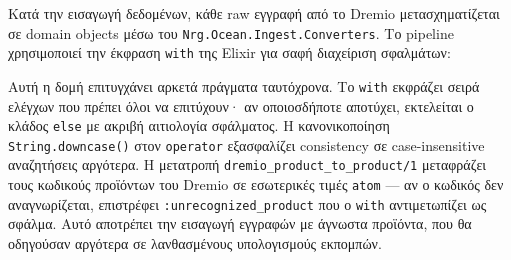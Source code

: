 Κατά την εισαγωγή δεδομένων, κάθε raw εγγραφή από το Dremio
μετασχηματίζεται σε domain objects μέσω του
\texttt{Nrg.Ocean.Ingest.Converters}. Το pipeline χρησιμοποιεί την
έκφραση \texttt{with} της Elixir για σαφή διαχείριση σφαλμάτων:

\begin{Shaded}
\begin{Highlighting}[]
\FunctionTok{(}\NormalTok{\%}\FunctionTok{\{}\FunctionTok{\}}\NormalTok{, } \FunctionTok{)} 
 \FunctionTok{(}\FunctionTok{)} \OperatorTok{\textless{}{-}}\OtherTok{[}\OtherTok{]}\NormalTok{,}
\OperatorTok{ !=}  \OperatorTok{\textless{}{-}}
\FunctionTok{(}\OtherTok{[}\OtherTok{]}\FunctionTok{)} 
    \FunctionTok{\{}\NormalTok{,}
\NormalTok{     \%}\FunctionTok{\{}
       \OtherTok{[}\OtherTok{]}\NormalTok{,}
       \OperatorTok{|\textgreater{}} \FunctionTok{()}\NormalTok{,}
       \FunctionTok{(}\OtherTok{[}\OtherTok{]}\FunctionTok{)}\NormalTok{,}
     \FunctionTok{\}\}}
     \OperatorTok{{-}\textgreater{}}
      \FunctionTok{\{}\NormalTok{, }\FunctionTok{\}}

     \OperatorTok{{-}\textgreater{}}
      \FunctionTok{\{}\NormalTok{, }\FunctionTok{\}}
\end{Highlighting}
\end{Shaded}

Αυτή η δομή επιτυγχάνει αρκετά πράγματα ταυτόχρονα. Το \texttt{with}
εκφράζει σειρά ελέγχων που πρέπει όλοι να επιτύχουν· αν οποιοσδήποτε
αποτύχει, εκτελείται ο κλάδος \texttt{else} με ακριβή αιτιολογία
σφάλματος. Η κανονικοποίηση \texttt{String.downcase()} στον
\texttt{operator} εξασφαλίζει consistency σε case-insensitive
αναζητήσεις αργότερα. Η μετατροπή
\texttt{dremio\_product\_to\_product/1} μεταφράζει τους κωδικούς
προϊόντων του Dremio σε εσωτερικές τιμές \texttt{atom} --- αν ο κωδικός
δεν αναγνωρίζεται, επιστρέφει \texttt{:unrecognized\_product} που ο
\texttt{with} αντιμετωπίζει ως σφάλμα. Αυτό αποτρέπει την εισαγωγή
εγγραφών με άγνωστα προϊόντα, που θα οδηγούσαν αργότερα σε λανθασμένους
υπολογισμούς εκπομπών.

